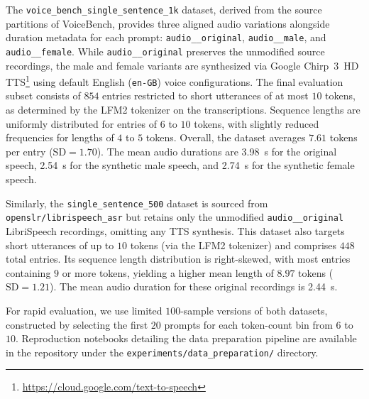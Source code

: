 \documentclass[cameraready]{Interspeech}
\begin{document}
The \texttt{voice\_bench\_single\_sentence\_1k} dataset, derived from the source partitions of VoiceBench, provides three aligned audio variations alongside duration metadata for each prompt: \texttt{audio\_\_original}, \texttt{audio\_\_male}, and \texttt{audio\_\_female}. While \texttt{audio\_\_original} preserves the unmodified source recordings, the male and female variants are synthesized via Google Chirp~3~HD TTS\footnote{\url{https://cloud.google.com/text-to-speech}} using default English (\texttt{en-GB}) voice configurations. The final evaluation subset consists of $854$ entries restricted to short utterances of at most $10$ tokens, as determined by the LFM2 tokenizer on the transcriptions. Sequence lengths are uniformly distributed for entries of $6$ to $10$ tokens, with slightly reduced frequencies for lengths of $4$ to $5$ tokens. Overall, the dataset averages $7.61$ tokens per entry ($\text{SD} = 1.70$). The mean audio durations are \SI{3.98}{\second} for the original speech, \SI{2.54}{\second} for the synthetic male speech, and \SI{2.74}{\second} for the synthetic female speech.

Similarly, the \texttt{single\_sentence\_500} dataset is sourced from \texttt{openslr/librispeech\_asr} but retains only the unmodified \texttt{audio\_\_original} LibriSpeech recordings, omitting any TTS synthesis. This dataset also targets short utterances of up to $10$ tokens (via the LFM2 tokenizer) and comprises $448$ total entries. Its sequence length distribution is right-skewed, with most entries containing $9$ or more tokens, yielding a higher mean length of $8.97$ tokens ($\text{SD} = 1.21$). The mean audio duration for these original recordings is \SI{2.44}{\second}.

For rapid evaluation, we use limited $100$-sample versions of both datasets, constructed by selecting the first $20$ prompts for each token-count bin from $6$ to $10$. Reproduction notebooks detailing the data preparation pipeline are available in the repository under the \texttt{experiments/data\_preparation/} directory.
\end{document}
